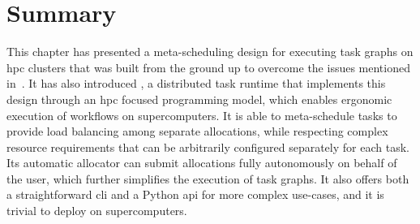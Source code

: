 %

\section*{Summary}
This chapter has presented a meta-scheduling design for executing task graphs on
\gls{hpc} clusters that was built from the ground up to overcome the issues
mentioned in~. It has also introduced \hyperqueue{}, a
distributed task runtime that implements this design through an \gls{hpc} focused
programming model, which enables ergonomic execution of workflows on supercomputers. It is able to
meta-schedule tasks to provide load balancing among separate allocations, while respecting complex
resource requirements that can be arbitrarily configured separately for each task. Its automatic
allocator can submit allocations fully autonomously on behalf of the user, which further simplifies
the execution of \hyperqueue{} task graphs. It also offers both a straightforward
\gls{cli} and a Python \gls{api} for more complex use-cases, and it
is trivial to deploy on supercomputers.

